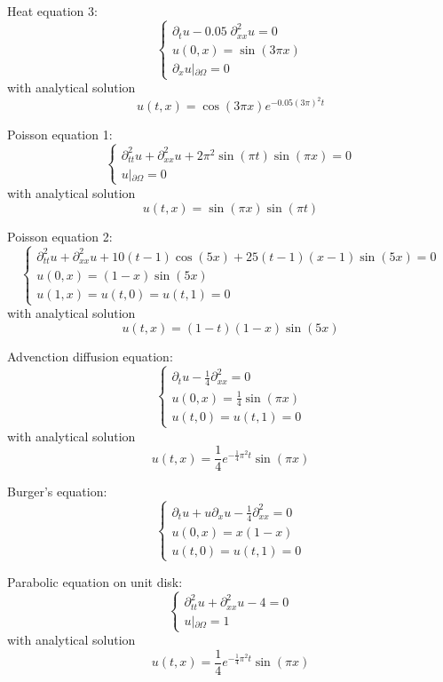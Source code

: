 \documentclass{article}
\begin{document}
\begin{enumerate}[label={[\arabic*]}]
\item{Heat equation 3: 
\[\left\{ \begin{array}{llllllll}
\partial_{t} u - 0.05\; \partial_{xx}^2 u = 0\\
u(0,x)=\sin(3\pi x)\\
\partial_x u\left|_{\partial\Omega}\right.=0
\end{array}
\right.\]
with analytical solution
\[u(t,x)=\cos(3\pi x)e^{-0.05(3\pi)^2t}\]\label{eq:Heat2D3}}

\item{Poisson equation 1:
\[\left\{ \begin{array}{llllllll}
\partial_{tt}^2 u + \partial_{xx}^2 u + 2\pi^2\sin(\pi t)\sin(\pi x) = 0\\
u\left|_{\partial\Omega}\right.=0
\end{array}
\right. \]
with analytical solution
\[u(t,x)=\sin(\pi x)\sin(\pi t)\]\label{eq:Poisson2D1}}

\item{Poisson equation 2:
\[\left\{ \begin{array}{llllllll}
\partial_{tt}^2 u + \partial_{xx}^2 u +10(t-1)\cos(5x)+25(t-1)(x-1)\sin(5x) = 0\\
u(0,x)=(1-x)\sin(5x)\\
u(1,x)=u(t,0)=u(t,1)=0
\end{array}
\right.\]
with analytical solution
\[u(t,x)=(1-t)(1-x)\sin(5 x)\]\label{eq:Poisson2D2}}

\item{Advenction diffusion equation:
\[\left\{ \begin{array}{llllllll}
\partial_{t} u -\frac{1}{4} \partial_{xx}^2= 0\\
u(0,x)=\frac{1}{4}\sin(\pi x)\\
u(t,0)=u(t,1)=0
\end{array}
\right.\]
with analytical solution
\[u(t,x)=\frac{1}{4}e^{-\frac{1}{4}\pi^2 t}\sin(\pi x)\]\label{eq:Advection2D}}

\item{Burger's equation: 
\[\left\{ \begin{array}{llllllll}
\partial_{t} u +u\partial_x u-\frac{1}{4} \partial_{xx}^2= 0\\
u(0,x)=x(1-x)\\
u(t,0)=u(t,1)=0
\end{array}
\right.\]\label{eq:Burgers2D}}

\item{Parabolic equation on unit disk:
\[\left\{ \begin{array}{llllllll}
\partial_{tt}^2 u + \partial_{xx}^2 u -4= 0\\
u\left|_{\partial\Omega}\right.=1
\end{array}
\right.\]
with analytical solution
\[u(t,x)=\frac{1}{4}e^{-\frac{1}{4}\pi^2 t}\sin(\pi x)\]\label{eq:Parabolic2D}}


\end{enumerate}
\end{document}
